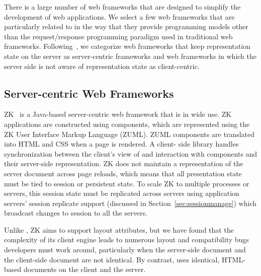 
There is a large number of web frameworks that are designed to simplify
the development of web applications.  We select a few web frameworks that
are particularly related to \cb in the way that they provide programming
models other than the request/response programming paradigm used in
traditional web frameworks.  Following~\cite{ChenCheng:book2007}, we
categorize web frameworks that keep representation state on the server
as server-centric frameworks and web frameworks in which the server side
is not aware of representation state as client-centric.

%
%
\subsection{Server-centric Web Frameworks}


ZK~\cite{ChenCheng:book2007} is a Java-based server-centric web framework that
is in wide use. ZK applications are constructed using components, which are
represented using the ZK User Interface Markup Language (ZUML).  ZUML
components are translated into HTML and CSS when a page is rendered. A client-
side library handles synchronization between the client's  view of and
interaction with components and their server-side  representation.  ZK does
not maintain a representation of the server document across page reloads,
which means that all presentation state must be tied to session or persistent
state. To scale ZK to multiple processes or servers, this session state must
be replicated across servers using application servers' session replicate
support  (discussed in Section~\ref{sec:sessionmanage}) which broadcast
changes to session to all the servers.

Unlike \projectname{}, ZK aims to support layout attributes, but
we have found that the complexity of its client engine leads to 
numerous layout and compatibility bugs developers must work around,
particularly when the server-side document and the client-side
document are not identical.  By contrast, \cb uses identical, HTML-based
documents on the client and the server.

